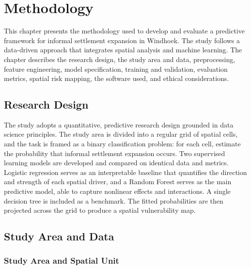 \providecommand{\fill}[1]{\textbf{[#1]}}

\chapter{Methodology}

This chapter presents the methodology used to develop and evaluate a predictive
framework for informal settlement expansion in Windhoek. The study follows a
data-driven approach that integrates spatial analysis and machine learning. The
chapter describes the research design, the study area and data, preprocessing,
feature engineering, model specification, training and validation, evaluation
metrics, spatial risk mapping, the software used, and ethical considerations.

\section{Research Design}

The study adopts a quantitative, predictive research design grounded in data
science principles. The study area is divided into a regular grid of spatial
cells, and the task is framed as a binary classification problem: for each cell,
estimate the probability that informal settlement expansion occurs. Two
supervised learning models are developed and compared on identical data and
metrics. Logistic regression serves as an interpretable baseline that quantifies
the direction and strength of each spatial driver, and a Random Forest serves as
the main predictive model, able to capture nonlinear effects and interactions. A
single decision tree is included as a benchmark. The fitted probabilities are
then projected across the grid to produce a spatial vulnerability map.

\section{Study Area and Data}

\subsection{Study Area and Spatial Unit}

